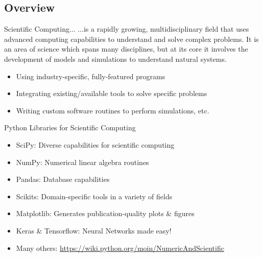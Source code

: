 \documentclass[11pt,table]{beamer}
\begin{document}
\subsection{Overview}
\begin{frame}{}

\begin{block}{Scientific Computing...}
...is a rapidly growing, multidisciplinary field that uses advanced computing
capabilities to understand and solve complex problems. It is an area of science
which spans many disciplines, but at its core it involves the development of
models and simulations to understand natural systems.\footnotemark[1]
\end{block}

\begin{itemize}
\item Using industry-specific, fully-featured programs 
\item Integrating existing/available tools to solve specific problems 
\item Writing custom software routines to perform simulations, etc.
\end{itemize}

\end{frame}

\begin{frame}{Python Libraries for Scientific Computing}

\vfill
\begin{itemize}
\item SciPy: Diverse capabilities for scientific computing
\vfill
\item NumPy: Numerical linear algebra routines
\vfill
\item Pandas: Database capabilities
\vfill
\item Scikits: Domain-specific tools in a variety of fields
\vfill
\item Matplotlib: Generates publication-quality plots \& figures
\vfill
\item Keras \& Tensorflow: Neural Networks made easy!
\vfill
\item Many others: \url{https://wiki.python.org/moin/NumericAndScientific}
\end{itemize}
\vfill

\end{frame}
\end{document}
